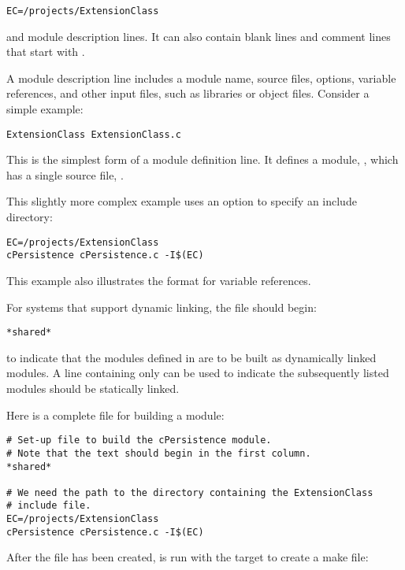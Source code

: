 \documentclass{manual}
\begin{document}
\begin{verbatim}
EC=/projects/ExtensionClass
\end{verbatim}

and module description lines.  It can also contain blank lines and
comment lines that start with \character{\#}.

A module description line includes a module name, source files,
options, variable references, and other input files, such
as libraries or object files.  Consider a simple example:

\begin{verbatim}
ExtensionClass ExtensionClass.c
\end{verbatim}

This is the simplest form of a module definition line.  It defines a
module, , which has a single source file,
.

This slightly more complex example uses an  option to
specify an include directory:

\begin{verbatim}
EC=/projects/ExtensionClass
cPersistence cPersistence.c -I$(EC)
\end{verbatim} %

This example also illustrates the format for variable references.

For systems that support dynamic linking, the  file should 
begin:

\begin{verbatim}
*shared*
\end{verbatim}

to indicate that the modules defined in  are to be built
as dynamically linked modules.  A line containing only 
can be used to indicate the subsequently listed modules should be
statically linked.

Here is a complete  file for building a
 module:

\begin{verbatim}
# Set-up file to build the cPersistence module. 
# Note that the text should begin in the first column.
*shared*

# We need the path to the directory containing the ExtensionClass
# include file.
EC=/projects/ExtensionClass
cPersistence cPersistence.c -I$(EC)
\end{verbatim} %

After the  file has been created, 
is run with the  target to create a make file:
\end{document}
